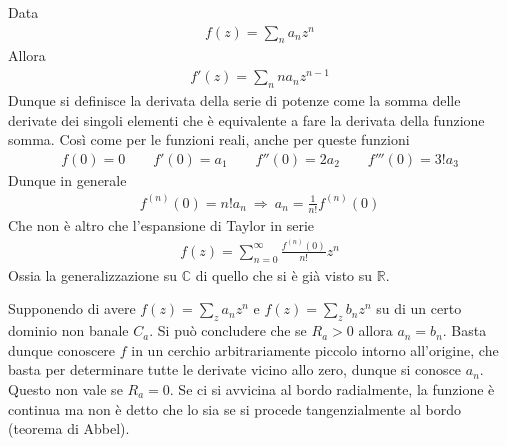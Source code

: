 \documentclass[a4paper, oneside]{article}
\begin{document}
\begin{theorem}
    Data 
    \begin{gather*}
        f(z) = \sum_{n }^{} a_n z^{n}
    \end{gather*}
    Allora 
    \begin{gather*}
        f'(z) = \sum_{n }^{} na_n z^{n - 1}
    \end{gather*}
    Dunque si definisce la derivata della serie di potenze come 
    la somma delle derivate dei singoli elementi che è equivalente a fare la derivata della funzione somma.
    Così come per le funzioni reali, anche per queste funzioni 
    \begin{gather*}
        f(0) = 0 \qquad f'(0) = a_1 \qquad f''(0) = 2a_2 \qquad f'''(0) = 3! a_3
    \end{gather*}
    Dunque in generale
    \begin{gather*}
        f^{(n)}(0) = n!a_n \ \Longrightarrow \ a_n = \frac{1}{n!}f^{(n)}( 0)
    \end{gather*}
    Che non è altro che l'espansione di Taylor in serie
    \begin{gather*}
        f(z) = \sum_{n = 0}^{\infty } \frac{f^{(n)}(0)}{n!}z^{n}
    \end{gather*}
    Ossia la generalizzazione su $\mathbb{C}$ di quello che si è già visto su 
    $\mathbb{R}$. 
\end{theorem}\noindent
Supponendo di avere $f(z) = \sum_{z }^{} a_n z^{n}$ e $f(z) = \sum_{z} b_n z^{n}$ 
su di un certo dominio non banale $C_a$. Si può concludere che se $R_a > 0$ allora $a_n = b_n$. 
Basta dunque conoscere $f$ in un cerchio arbitrariamente piccolo intorno all'origine, che basta per determinare 
tutte le derivate vicino allo zero, dunque si conosce $a_n$. Questo non vale se $R_a = 0 $. 
Se ci si avvicina al bordo radialmente, la funzione è continua ma non è detto che lo sia 
se si procede tangenzialmente al bordo (teorema di Abbel).
\end{document}
